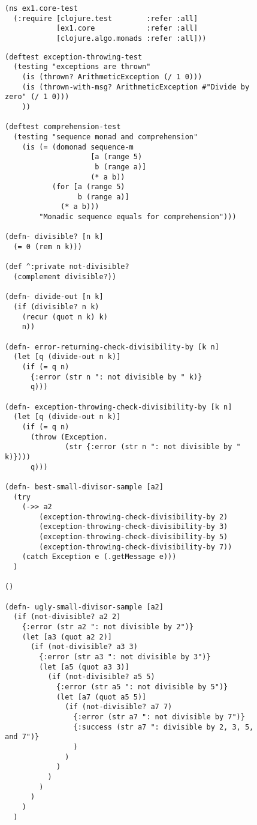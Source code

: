 \documentclass[11pt]{article}
\begin{document}
\begin{figure}[H]
\label{main-test-namespace}
\begin{verbatim}
(ns ex1.core-test
  (:require [clojure.test        :refer :all]
            [ex1.core            :refer :all]
            [clojure.algo.monads :refer :all]))
\end{verbatim}
\end{figure}

\begin{figure}[H]
\label{test-monads}
\begin{verbatim}
(deftest exception-throwing-test
  (testing "exceptions are thrown"
    (is (thrown? ArithmeticException (/ 1 0)))
    (is (thrown-with-msg? ArithmeticException #"Divide by zero" (/ 1 0)))
    ))

(deftest comprehension-test
  (testing "sequence monad and comprehension"
    (is (= (domonad sequence-m
                    [a (range 5)
                     b (range a)]
                    (* a b))
           (for [a (range 5)
                 b (range a)]
             (* a b)))
        "Monadic sequence equals for comprehension")))

(defn- divisible? [n k]
  (= 0 (rem n k)))

(def ^:private not-divisible?
  (complement divisible?))

(defn- divide-out [n k]
  (if (divisible? n k)
    (recur (quot n k) k)
    n))

(defn- error-returning-check-divisibility-by [k n]
  (let [q (divide-out n k)]
    (if (= q n)
      {:error (str n ": not divisible by " k)}
      q)))

(defn- exception-throwing-check-divisibility-by [k n]
  (let [q (divide-out n k)]
    (if (= q n)
      (throw (Exception.
              (str {:error (str n ": not divisible by " k)})))
      q)))

(defn- best-small-divisor-sample [a2]
  (try
    (->> a2
        (exception-throwing-check-divisibility-by 2)
        (exception-throwing-check-divisibility-by 3)
        (exception-throwing-check-divisibility-by 5)
        (exception-throwing-check-divisibility-by 7))
    (catch Exception e (.getMessage e)))
  )

()

(defn- ugly-small-divisor-sample [a2]
  (if (not-divisible? a2 2)
    {:error (str a2 ": not divisible by 2")}
    (let [a3 (quot a2 2)]
      (if (not-divisible? a3 3)
        {:error (str a3 ": not divisible by 3")}
        (let [a5 (quot a3 3)]
          (if (not-divisible? a5 5)
            {:error (str a5 ": not divisible by 5")}
            (let [a7 (quot a5 5)]
              (if (not-divisible? a7 7)
                {:error (str a7 ": not divisible by 7")}
                {:success (str a7 ": divisible by 2, 3, 5, and 7")}
                )
              )
            )
          )
        )
      )
    )
  )


\end{verbatim}
\end{figure}
\end{document}
